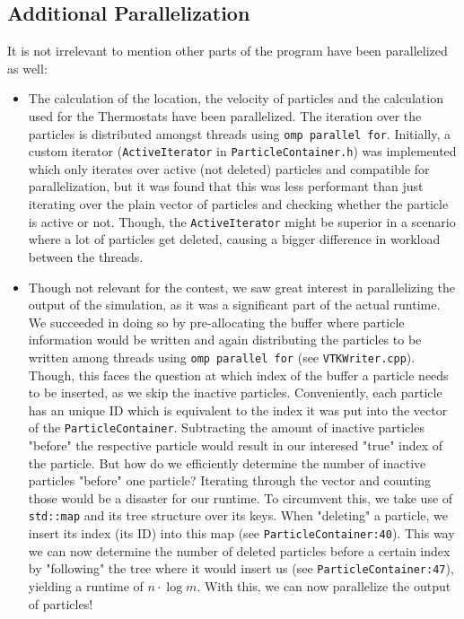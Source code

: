 \documentclass{article}
\begin{document}
\subsection{Additional Parallelization}
It is not irrelevant to mention other parts of the program have been parallelized as well:
\begin{itemize}
    \item{The calculation of the location, the velocity of particles and the calculation used for the Thermostats have been parallelized. The iteration over the particles is distributed amongst threads using \texttt{omp parallel for}. Initially, a custom iterator (\texttt{ActiveIterator} in \texttt{ParticleContainer.h}) was implemented which only iterates over active (not deleted) particles and compatible for parallelization, but it was found that this was less performant than just iterating over the plain vector of particles and checking whether the particle is active or not. Though, the \texttt{ActiveIterator} might be superior in a scenario where a lot of particles get deleted, causing a bigger difference in workload between the threads.}
    \item{Though not relevant for the contest, we saw great interest in parallelizing the output of the simulation, as it was a significant part of the actual runtime. We succeeded in doing so by pre-allocating the buffer where particle information would be written and again distributing the particles to be written among threads using \texttt{omp parallel for} (see \texttt{VTKWriter.cpp}). Though, this faces the question at which index of the buffer a particle needs to be inserted, as we skip the inactive particles. Conveniently, each particle has an unique ID which is equivalent to the index it was put into the vector of the \texttt{ParticleContainer}. Subtracting the amount of inactive particles "before" the respective particle would result in our interesed "true" index of the particle. But how do we efficiently determine the number of inactive particles "before" one particle? Iterating through the vector and counting those would be a disaster for our runtime. To circumvent this, we take use of \texttt{std::map} and its tree structure over its keys. When "deleting" a particle, we insert its index (its ID) into this map (see \texttt{ParticleContainer:40}). This way we can now determine the number of deleted particles before a certain index by "following" the tree where it would insert us (see \texttt{ParticleContainer:47}), yielding a runtime of $n \cdot \log m$. With this, we can now parallelize the output of particles!}
\end{itemize}
\end{document}
